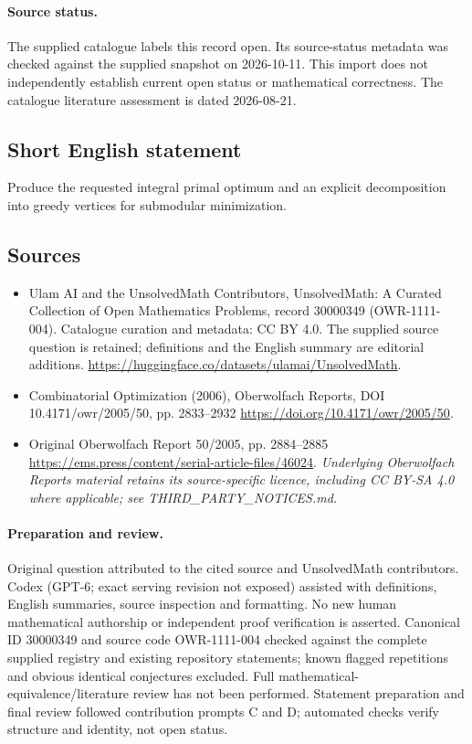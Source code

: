 \documentclass[11pt]{article}
\begin{document}
\paragraph{Source status.}
The supplied catalogue labels this record open. Its source-status metadata was checked against the supplied snapshot on 2026-10-11. This import does not independently establish current open status or mathematical correctness. The catalogue literature assessment is dated 2026-08-21.
\subsection{Short English statement}
Produce the requested integral primal optimum and an explicit decomposition into greedy vertices for submodular minimization.
\subsection{Sources}
\begin{itemize}
\item[\hypertarget{source:30000349:1}{S1}] Ulam AI and the UnsolvedMath Contributors, UnsolvedMath: A Curated Collection of Open Mathematics Problems, record 30000349 (OWR-1111-004). Catalogue curation and metadata: CC BY 4.0. The supplied source question is retained; definitions and the English summary are editorial additions.
\url{https://huggingface.co/datasets/ulamai/UnsolvedMath}.
\item[\hypertarget{source:30000349:2}{S2}] Combinatorial Optimization (2006), Oberwolfach Reports, DOI 10.4171/owr/2005/50, pp. 2833--2932
\url{https://doi.org/10.4171/owr/2005/50}.
\item[\hypertarget{source:30000349:3}{S3}] Original Oberwolfach Report 50/2005, pp. 2884--2885
\url{https://ems.press/content/serial-article-files/46024}.
\textit{Underlying Oberwolfach Reports material retains its source-specific licence, including CC BY-SA 4.0 where applicable; see THIRD\_PARTY\_NOTICES.md.}
\end{itemize}
\paragraph{Preparation and review.}
Original question attributed to the cited source and UnsolvedMath contributors. Codex (GPT-6; exact serving revision not exposed) assisted with definitions, English summaries, source inspection and formatting. No new human mathematical authorship or independent proof verification is asserted. Canonical ID 30000349 and source code OWR-1111-004 checked against the complete supplied registry and existing repository statements; known flagged repetitions and obvious identical conjectures excluded. Full mathematical-equivalence/literature review has not been performed. Statement preparation and final review followed contribution prompts C and D; automated checks verify structure and identity, not open status.
\label{end:30000349}
\end{document}
